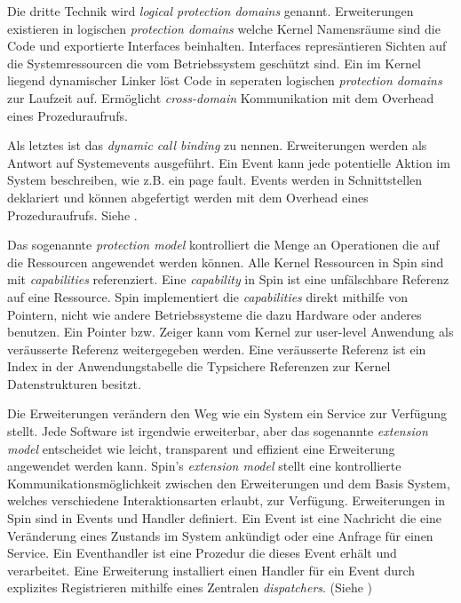 \documentclass[9pt,technote]{IEEEtran}
\begin{document}
      Die dritte Technik wird \textit{logical protection domains} genannt. Erweiterungen existieren in logischen \textit{protection domains} welche Kernel Namensr\"aume
      sind die Code und exportierte Interfaces beinhalten. Interfaces repres\"antieren Sichten auf die Systemressourcen die vom Betriebssystem gesch\"utzt sind.
      Ein im Kernel liegend dynamischer Linker l\"ost Code in seperaten logischen \textit{protection domains} zur Laufzeit auf. Erm\"oglicht \textit{cross-domain} Kommunikation 
      mit dem Overhead eines Prozeduraufrufs.
      
      Als letztes ist das \textit{dynamic call binding} zu nennen. Erweiterungen werden als Antwort auf Systemevents ausgef\"uhrt. Ein Event kann jede potentielle Aktion
      im System beschreiben, wie z.B. ein page fault. Events werden in Schnittstellen deklariert und k\"onnen abgefertigt werden mit dem Overhead eines Prozeduraufrufs.
      Siehe \cite[S. 267 f]{inproc:spin}.
      
      Das sogenannte \textit{protection model} kontrolliert die Menge an Operationen die auf die Ressourcen angewendet werden k\"onnen.
      Alle Kernel Ressourcen in Spin sind mit \textit{capabilities} referenziert. Eine \textit{capability} in Spin ist eine unf\"alschbare Referenz auf eine Ressource.
      Spin implementiert die \textit{capabilities} direkt mithilfe von Pointern, nicht wie andere Betriebssysteme die dazu Hardware oder anderes benutzen.
      Ein Pointer bzw. Zeiger kann vom Kernel zur user-level Anwendung als ver\"ausserte Referenz weitergegeben werden.
      Eine ver\"ausserte Referenz ist ein Index in der Anwendungstabelle die Typsichere Referenzen zur Kernel Datenstrukturen besitzt.
      
      Die Erweiterungen ver\"andern den Weg wie ein System ein Service zur Verf\"ugung stellt. Jede Software ist irgendwie erweiterbar, aber das sogenannte \textit{extension model}
      entscheidet wie leicht, transparent und effizient eine Erweiterung angewendet werden kann. Spin's \textit{extension model} stellt eine kontrollierte Kommunikationsm\"oglichkeit
      zwischen den Erweiterungen und dem Basis System, welches verschiedene Interaktionsarten erlaubt, zur Verf\"ugung.
      Erweiterungen in Spin sind in Events und Handler definiert. Ein Event ist eine Nachricht die eine Ver\"anderung eines Zustands im System ank\"undigt oder eine Anfrage f\"ur einen Service.
      Ein Eventhandler ist eine Prozedur die dieses Event erh\"alt und verarbeitet. Eine Erweiterung installiert einen Handler f\"ur ein Event durch explizites Registrieren mithilfe eines Zentralen 
      \textit{dispatchers}. (Siehe \cite[S. 272]{inproc:spin})
      
\end{document}

